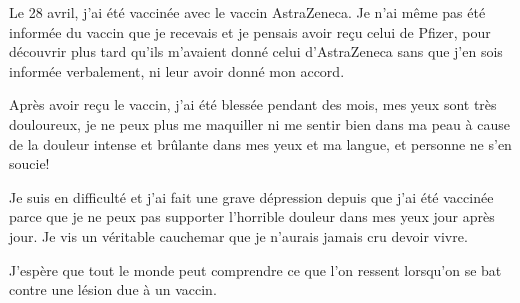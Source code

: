 Le 28 avril, j'ai été vaccinée avec le vaccin AstraZeneca. Je n'ai même pas été
informée du vaccin que je recevais et je pensais avoir reçu celui de Pfizer,
pour découvrir plus tard qu'ils m'avaient donné celui d'AstraZeneca sans que
j'en sois informée verbalement, ni leur avoir donné mon accord.

Après avoir reçu le vaccin, j'ai été blessée pendant des mois, mes yeux sont
très douloureux, je ne peux plus me maquiller ni me sentir bien dans ma peau à
cause de la douleur intense et brûlante dans mes yeux et ma langue, et personne
ne s'en soucie!

Je suis en difficulté et j'ai fait une grave dépression depuis que j'ai été
vaccinée parce que je ne peux pas supporter l'horrible douleur dans mes yeux
jour après jour. Je vis un véritable cauchemar que je n'aurais jamais cru devoir
vivre.

J'espère que tout le monde peut comprendre ce que l'on ressent lorsqu'on se bat
contre une lésion due à un vaccin.

